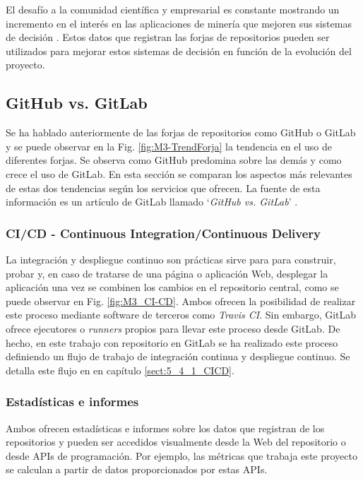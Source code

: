 El  desafío a la comunidad científica y empresarial  es constante mostrando un incremento en el interés en las aplicaciones de minería que mejoren sus sistemas de decisión \citep{guemes-pena_emerging_2018}. Estos datos que registran las forjas de repositorios pueden ser utilizados para mejorar estos sistemas de decisión en función de la evolución del proyecto.

\subsection{GitHub vs. GitLab}\label{sect:3_2_1_GitHubVSGitLab}


Se ha hablado anteriormente de las forjas de repositorios como GitHub o GitLab y se puede observar en la Fig. \ref{fig:M3-TrendForja} la tendencia en el uso de diferentes forjas. Se observa como GitHub predomina sobre las demás y como crece el uso de GitLab. En esta sección se comparan los aspectos más relevantes de estas dos tendencias según los servicios que ofrecen. La fuente de esta información es un artículo de GitLab llamado `\textit{GitHub vs. GitLab}' \cite{gitlab_github_nodate}.

\subsubsection{CI/CD - Continuous Integration/Continuous Delivery}
La integración y despliegue continuo son prácticas sirve para para construir, probar y, en caso de tratarse de una página o aplicación Web, desplegar la aplicación una vez se combinen los cambios en el repositorio central, como se puede observar en Fig. \ref{fig:M3_CI-CD}. Ambos ofrecen la posibilidad de realizar este proceso mediante software de terceros como \textit{Travis CI}. Sin embargo, GitLab ofrece ejecutores o \textit{runners} propios para llevar este proceso desde GitLab. De hecho, en este trabajo con repositorio en GitLab se ha realizado este proceso definiendo un flujo de trabajo de integración continua y despliegue continuo. Se detalla este flujo en en capítulo \ref{sect:5_4_1_CICD}.


\subsubsection{Estadísticas e informes}
Ambos ofrecen estadísticas e informes sobre los datos que registran de los repositorios y pueden ser accedidos visualmente desde la Web del repositorio o desde APIs de programación. Por ejemplo, las métricas que trabaja este proyecto se calculan a partir de datos proporcionados por estas APIs.

